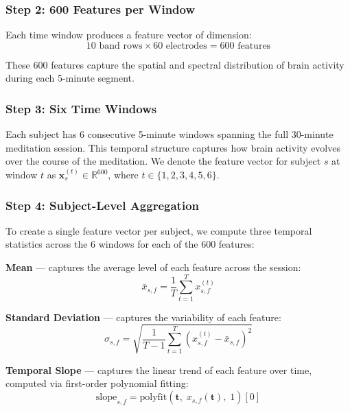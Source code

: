 \documentclass[12pt,a4paper]{article}
\begin{document}
\subsubsection{Step 2: 600 Features per Window}

Each time window produces a feature vector of dimension:
\[
10 \text{ band rows} \times 60 \text{ electrodes} = 600 \text{ features}
\]

These 600 features capture the spatial and spectral distribution of brain activity during each 5-minute segment.

\subsubsection{Step 3: Six Time Windows}

Each subject has 6 consecutive 5-minute windows spanning the full 30-minute meditation session. This temporal structure captures how brain activity evolves over the course of the meditation. We denote the feature vector for subject $s$ at window $t$ as $\mathbf{x}_s^{(t)} \in \mathbb{R}^{600}$, where $t \in \{1, 2, 3, 4, 5, 6\}$.

\subsubsection{Step 4: Subject-Level Aggregation}

To create a single feature vector per subject, we compute three temporal statistics across the 6 windows for each of the 600 features:

\textbf{Mean} --- captures the average level of each feature across the session:
\begin{equation}
\bar{x}_{s,f} = \frac{1}{T}\sum_{t=1}^{T} x_{s,f}^{(t)}
\label{eq:mean}
\end{equation}

\textbf{Standard Deviation} --- captures the variability of each feature:
\begin{equation}
\sigma_{s,f} = \sqrt{\frac{1}{T-1}\sum_{t=1}^{T} \left(x_{s,f}^{(t)} - \bar{x}_{s,f}\right)^2}
\label{eq:std}
\end{equation}

\textbf{Temporal Slope} --- captures the linear trend of each feature over time, computed via first-order polynomial fitting:
\begin{equation}
\text{slope}_{s,f} = \text{polyfit}\left(\mathbf{t},\; x_{s,f}(\mathbf{t}),\; 1\right)[0]
\label{eq:slope}
\end{equation}
\end{document}
